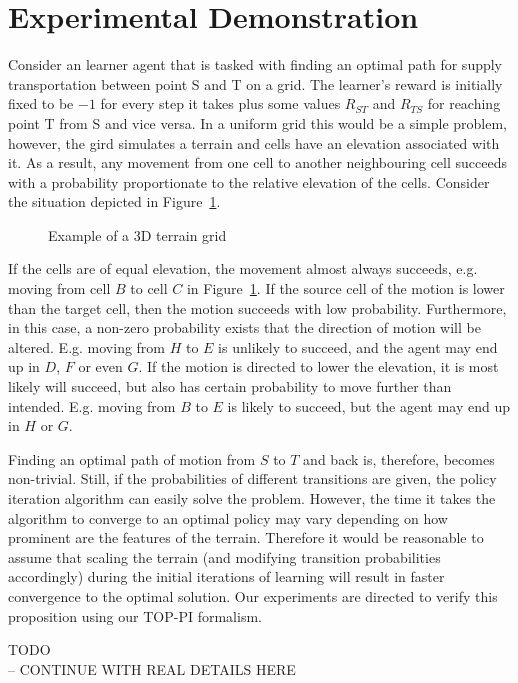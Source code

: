 \documentclass[letterpaper]{aamas2009}
\begin{document}
\section{Experimental Demonstration}
Consider an learner agent that is tasked with finding an optimal path
for supply transportation between point S and T on a grid. The
learner's reward is initially fixed to be $-1$ for every step it takes
plus some values $R_{ST}$ and $R_{TS}$ for reaching point T from S and
vice versa. In a uniform grid this would be a simple problem, however,
the gird simulates a terrain and cells have an elevation associated
with it. As a result, any movement from one cell to another
neighbouring cell succeeds with a probability proportionate to the
relative elevation of the cells. Consider the situation depicted in Figure~\ref{exp_motion}. 

\begin{figure}[ht]
\centerline{}
\caption{\label{exp_motion}Example of a 3D terrain grid}
\end{figure}

If the cells are of equal elevation, the movement almost always
succeeds, e.g. moving from cell $B$ to cell $C$ in
Figure~\ref{exp_motion}. If the source cell of the motion is lower
than the target cell, then the motion succeeds with low
probability. Furthermore, in this case, a non-zero probability exists
that the direction of motion will be altered. E.g. moving from $H$ to
$E$ is unlikely to succeed, and the agent may end up in $D$, $F$ or
even $G$. If the motion is directed to lower the elevation, it is most
likely will succeed, but also has certain probability to move further
than intended. E.g. moving from $B$ to $E$ is likely to succeed, but
the agent may end up in $H$ or $G$.

Finding an optimal path of motion from $S$ to $T$ and back is,
therefore, becomes non-trivial. Still, if the probabilities of
different transitions are given, the policy iteration algorithm can
easily solve the problem. However, the time it takes the algorithm to
converge to an optimal policy may vary depending on how prominent are
the features of the terrain. Therefore it would be reasonable to
assume that scaling the terrain (and modifying transition
probabilities accordingly) during the initial iterations of learning
will result in faster convergence to the optimal solution. Our
experiments are directed to verify this proposition using our TOP-PI formalism.

{\Large TODO\\ -- CONTINUE WITH REAL DETAILS HERE}
\end{document}
